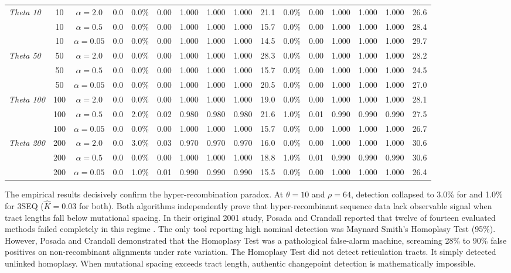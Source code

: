 \begin{table}[t!]
\begin{tabular*}{\textwidth}{@{\extracolsep{\fill}} l c c r rrrrrr rrrrrr @{}}
\textit{Theta 10} & 10 & $\alpha = 2.0$ & 0.0 & 0.0\% & 0.00 & 1.000 & 1.000 & 1.000 & 21.1 & 0.0\% & 0.00 & 1.000 & 1.000 & 1.000 & 26.6 \\
& 10 & $\alpha = 0.5$ & 0.0 & 0.0\% & 0.00 & 1.000 & 1.000 & 1.000 & 15.7 & 0.0\% & 0.00 & 1.000 & 1.000 & 1.000 & 28.4 \\
& 10 & $\alpha = 0.05$ & 0.0 & 0.0\% & 0.00 & 1.000 & 1.000 & 1.000 & 14.5 & 0.0\% & 0.00 & 1.000 & 1.000 & 1.000 & 29.7 \\
\addlinespace
\textit{Theta 50} & 50 & $\alpha = 2.0$ & 0.0 & 0.0\% & 0.00 & 1.000 & 1.000 & 1.000 & 28.3 & 0.0\% & 0.00 & 1.000 & 1.000 & 1.000 & 28.2 \\
& 50 & $\alpha = 0.5$ & 0.0 & 0.0\% & 0.00 & 1.000 & 1.000 & 1.000 & 15.7 & 0.0\% & 0.00 & 1.000 & 1.000 & 1.000 & 24.5 \\
& 50 & $\alpha = 0.05$ & 0.0 & 0.0\% & 0.00 & 1.000 & 1.000 & 1.000 & 20.5 & 0.0\% & 0.00 & 1.000 & 1.000 & 1.000 & 27.0 \\
\addlinespace
\textit{Theta 100} & 100 & $\alpha = 2.0$ & 0.0 & 0.0\% & 0.00 & 1.000 & 1.000 & 1.000 & 19.0 & 0.0\% & 0.00 & 1.000 & 1.000 & 1.000 & 28.1 \\
& 100 & $\alpha = 0.5$ & 0.0 & 2.0\% & 0.02 & 0.980 & 0.980 & 0.980 & 21.6 & 1.0\% & 0.01 & 0.990 & 0.990 & 0.990 & 27.5 \\
& 100 & $\alpha = 0.05$ & 0.0 & 0.0\% & 0.00 & 1.000 & 1.000 & 1.000 & 15.7 & 0.0\% & 0.00 & 1.000 & 1.000 & 1.000 & 26.7 \\
\addlinespace
\textit{Theta 200} & 200 & $\alpha = 2.0$ & 0.0 & 3.0\% & 0.03 & 0.970 & 0.970 & 0.970 & 16.0 & 0.0\% & 0.00 & 1.000 & 1.000 & 1.000 & 30.6 \\
& 200 & $\alpha = 0.5$ & 0.0 & 0.0\% & 0.00 & 1.000 & 1.000 & 1.000 & 18.8 & 1.0\% & 0.01 & 0.990 & 0.990 & 0.990 & 30.6 \\
& 200 & $\alpha = 0.05$ & 0.0 & 1.0\% & 0.01 & 0.990 & 0.990 & 0.990 & 15.5 & 0.0\% & 0.00 & 1.000 & 1.000 & 1.000 & 26.4 \\
\bottomrule
\end{tabular*}
\end{table}

The empirical results decisively confirm the hyper-recombination paradox.
At $\theta = 10$ and $\rho = 64$, detection collapsed to 3.0\% for \RhizAeon and 1.0\% for 3SEQ ($\hat{K} = 0.03$ for both).
Both algorithms independently prove that hyper-recombinant sequence data lack observable signal when tract lengths fall below mutational spacing.
In their original 2001 study, Posada and Crandall reported that twelve of fourteen evaluated methods failed completely in this regime \cite{posada2001evaluation}.
The only tool reporting high nominal detection was Maynard Smith's Homoplasy Test (95\%).
However, Posada and Crandall demonstrated that the Homoplasy Test was a pathological false-alarm machine, screaming 28\% to 90\% false positives on non-recombinant alignments under rate variation.
The Homoplasy Test did not detect reticulation tracts.
It simply detected unlinked homoplasy.
When mutational spacing exceeds tract length, authentic changepoint detection is mathematically impossible.

